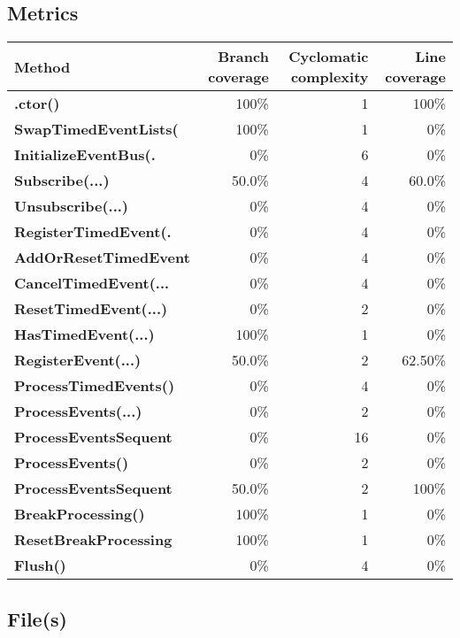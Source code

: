 \documentclass[a4paper,landscape,10pt]{article}
\begin{document}
\subsection{Metrics}
\begin{longtable}[l]{|l|r|r|r|}
\hline
\textbf{Method} & \textbf{Branch coverage} & \textbf{Cyclomatic complexity} & \textbf{Line coverage}\\
\hline
\textbf{.ctor()} & 100\% & 1 & 100\%\\
\hline
\textbf{SwapTimedEventLists(} & 100\% & 1 & 0\%\\
\hline
\textbf{InitializeEventBus(.} & 0\% & 6 & 0\%\\
\hline
\textbf{Subscribe(...)} & 50.0\% & 4 & 60.0\%\\
\hline
\textbf{Unsubscribe(...)} & 0\% & 4 & 0\%\\
\hline
\textbf{RegisterTimedEvent(.} & 0\% & 4 & 0\%\\
\hline
\textbf{AddOrResetTimedEvent} & 0\% & 4 & 0\%\\
\hline
\textbf{CancelTimedEvent(...} & 0\% & 4 & 0\%\\
\hline
\textbf{ResetTimedEvent(...)} & 0\% & 2 & 0\%\\
\hline
\textbf{HasTimedEvent(...)} & 100\% & 1 & 0\%\\
\hline
\textbf{RegisterEvent(...)} & 50.0\% & 2 & 62.50\%\\
\hline
\textbf{ProcessTimedEvents()} & 0\% & 4 & 0\%\\
\hline
\textbf{ProcessEvents(...)} & 0\% & 2 & 0\%\\
\hline
\textbf{ProcessEventsSequent} & 0\% & 16 & 0\%\\
\hline
\textbf{ProcessEvents()} & 0\% & 2 & 0\%\\
\hline
\textbf{ProcessEventsSequent} & 50.0\% & 2 & 100\%\\
\hline
\textbf{BreakProcessing()} & 100\% & 1 & 0\%\\
\hline
\textbf{ResetBreakProcessing} & 100\% & 1 & 0\%\\
\hline
\textbf{Flush()} & 0\% & 4 & 0\%\\
\hline
\end{longtable}
\subsection{File(s)}
\end{document}
